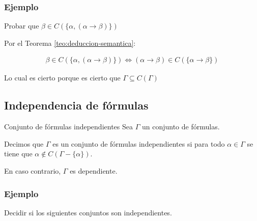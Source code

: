 \subsubsection{Ejemplo}

Probar que $\beta \in C( \{ \alpha, (\alpha\to\beta) \})$

Por el Teorema \ref{teo:deduccion-semantica}:

\begin{gather*}
    \beta \in C( \{ \alpha, (\alpha\to\beta) \}) \iff
    (\alpha\to\beta) \in C(\{ \alpha\to\beta \})
\end{gather*}

Lo cual es cierto porque es cierto que $\Gamma \subseteq C(\Gamma)$


\subsection{Independencia de fórmulas}

\begin{definicion}{Conjunto de fórmulas independientes}{}
    Sea $\Gamma$ un conjunto de fórmulas.

    \medskip

    Decimos que $\Gamma$ es un conjunto de fórmulas independientes si para
    todo $\alpha \in \Gamma$ se tiene que $\alpha \notin C(\Gamma-\{\alpha\})$.

    En caso contrario, $\Gamma$ es dependiente.
\end{definicion}

\subsubsection{Ejemplo}

Decidir si los siguientes conjuntos son independientes.

